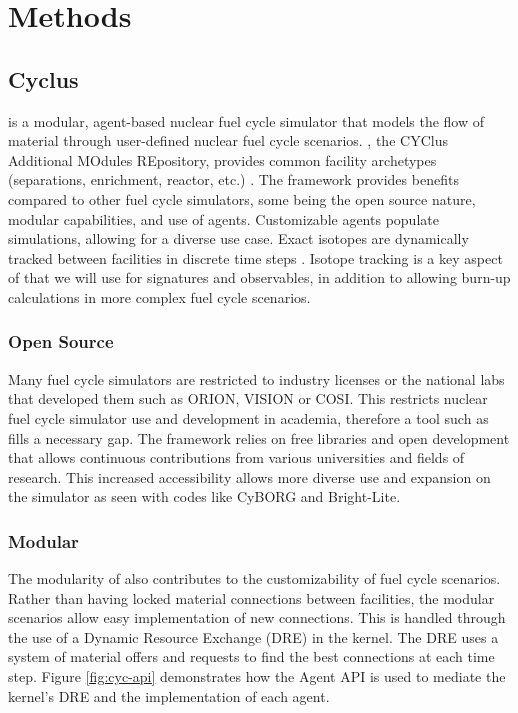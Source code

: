 \chapter[Methods]{Methods}
\section{Cyclus}

\Cyclus is a modular, agent-based nuclear fuel cycle simulator that models the flow of material through user-defined nuclear fuel cycle scenarios. \Cycamore, the CYClus 
Additional MOdules REpository, provides common facility archetypes (separations, enrichment, reactor, etc.) \cite{carlsen_cycamore_2014}. 
The \Cyclus framework provides benefits compared to other fuel cycle simulators, some being the open source nature, modular capabilities, and use of agents.
Customizable agents populate simulations, allowing for a diverse use case. Exact isotopes are dynamically tracked between facilities in discrete time steps \cite{huff_fundamental_2016}.
Isotope tracking is a key aspect of \Cyclus that we will use for signatures and observables, in addition to allowing burn-up calculations in more complex fuel cycle scenarios.

\subsection{Open Source}

Many fuel cycle simulators are restricted to industry licenses or the national labs that developed them such as ORION, VISION or COSI. This restricts
nuclear fuel cycle simulator use and development in academia, therefore a tool such as \Cyclus fills a necessary gap. The \Cyclus framework relies on
free libraries and open development that allows continuous contributions from various universities and fields of research. This increased accessibility allows
more diverse use and expansion on the simulator as seen with codes like CyBORG and Bright-Lite.

\subsection{Modular}

The modularity of \Cyclus also contributes to the customizability of fuel cycle scenarios. Rather than having locked material connections between facilities, the modular
\Cyclus scenarios allow easy implementation of new connections. This is handled through the use of a Dynamic Resource Exchange (DRE) in the \Cyclus kernel. The DRE 
uses a system of material offers and requests to find the best connections at each time step. Figure \ref{fig:cyc-api} demonstrates how the Agent API is used to mediate
the \Cyclus kernel's DRE and the implementation of each agent.  

